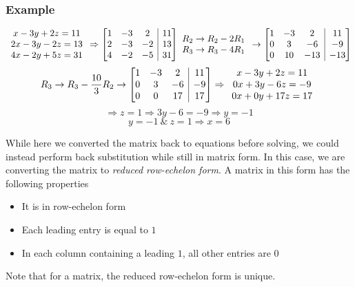 \documentclass[12pt]{report}
\makeatletter
\newenvironment{amatrix}[1]{%
  \left[\begin{array}{@{}*{#1}{c}|c@{}}
}{%
  \end{array}\right]
}
\makeatother
\begin{document}
\begin{flushleft}
\subsubsection*{Example}


\[
    \begin{array}{c}
      x - 3y + 2z = 11 \\
      2x - 3y - 2z = 13 \\
      4x - 2y + 5z = 31 \\ 
    \end{array}
    \Rightarrow
    \begin{amatrix}{3}
      1 & -3 & 2 & 11 \\
      2 & -3 & -2 & 13 \\
      4 & -2 & -5 & 31 \\
    \end{amatrix}
    \begin{array}{c}
      R_2 \rightarrow R_2 - 2R_1 \\
      R_3 \rightarrow R_3 - 4R_1
    \end{array}
    \rightarrow
    \begin{amatrix}{3}
      1 & -3 & 2 & 11 \\
      0 & 3 & -6 & -9 \\
      0 & 10 & -13 & -13 \\
    \end{amatrix}
\]
\[
    R_3 \rightarrow R_3 - \frac{10}{3}R_2
    \rightarrow
    \begin{amatrix}{3}
      1 & -3 & 2 & 11 \\
      0 & 3 & -6 & -9 \\
      0 & 0 & 17 & 17 \\
    \end{amatrix}
    \Rightarrow
    \begin{array}{c}
      x -3y + 2z = 11 \\
      0x + 3y -6z = -9 \\
      0x + 0y + 17z = 17            
    \end{array}
\]
\[\Rightarrow z = 1 \Rightarrow 3y - 6 = -9 \Rightarrow y = -1\]
\[y = -1 \:\&\: z = 1 \Rightarrow x = 6\]

While here we converted the matrix back to equations before solving, we could
instead perform back substitution while still in matrix form. In this case, we
are converting the matrix to \textit{reduced row-echelon form}. A matrix in this
form has the following properties
\begin{itemize}
  \item It is in row-echelon form
  \item Each leading entry is equal to \(1\)
  \item In each column containing a leading \(1\), all other entries are \(0\)
\end{itemize}
Note that for a matrix, the reduced row-echelon form is unique.


\end{flushleft}
\end{document}
